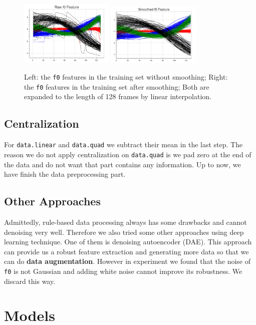 \documentclass[a4paper]{article}
\begin{document}
\begin{figure}[H]
	\centering
	\includegraphics[width = 0.4\textwidth]{figs/f0}
	\includegraphics[width = 0.4\textwidth]{figs/Sf0}
	\caption{Left: the \texttt{f0} features in the training set without smoothing; Right: the \texttt{f0} features in the training set after smoothing; Both are expanded to the length of 128 frames by linear interpolation.}
\end{figure}

\subsection{Centralization}
For \texttt{data.linear} and \texttt{data.quad} we subtract their mean in the last step. The reason we do not apply centralization on  \texttt{data.quad} is we pad zero at the end of the data and do not want that part contains any information. Up to now, we have finish the data preprocessing part.

\subsection{Other Approaches}
\label{dae}
Admittedly, rule-based data processing always has some drawbacks and cannot denoising very well. Therefore we also tried some other approaches using deep learning technique. One of them is denoising autoencoder (DAE). This approach can provide us a robust feature extraction and generating more data so that we can do  {\bf data augmentation}. However in experiment we found that the noise of \texttt{f0} is not Gaussian and adding white noise cannot improve its robustness. We discard this way.

\section{Models}
\end{document}
